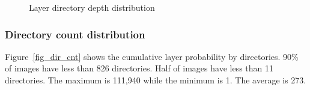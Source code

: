 \begin{figure}[!t]
	\centering
	\caption{Layer directory depth distribution}
	\label{fig-layer-dir}
\end{figure}

\subsubsection{Directory count distribution}

Figure~\ref{fig_dir_cnt} shows the cumulative layer probability by directories. 90\% of images have less than 826 directories. Half of images have less than 11 directories. The maximum is 111,940 while the minimum is 1. The average is 273. 

